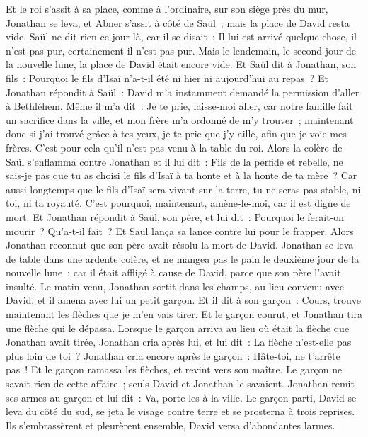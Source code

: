 \begin{multicols}{2}
Et le roi s'assit à sa place, comme à l'ordinaire, sur son siège près du mur, Jonathan se leva, et Abner s'assit à côté de Saül~; mais la place de David resta vide.
Saül ne dit rien ce jour-là, car il se disait~: Il lui est arrivé quelque chose, il n'est pas pur, certainement il n'est pas pur.
Mais le lendemain, le second jour de la nouvelle lune, la place de David était encore vide. Et Saül dit à Jonathan, son fils~: Pourquoi le fils d'Isaï n'a-t-il été ni hier ni aujourd'hui au repas~?
Et Jonathan répondit à Saül~: David m'a instamment demandé la permission d'aller à Bethléhem.
Même il m'a dit~: Je te prie, laisse-moi aller, car notre famille fait un sacrifice dans la ville, et mon frère m'a ordonné de m'y trouver~; maintenant donc si j'ai trouvé grâce à tes yeux, je te prie que j'y aille, afin que je voie mes frères. C'est pour cela qu'il n'est pas venu à la table du roi.
Alors la colère de Saül s'enflamma contre Jonathan et il lui dit~: Fils de la perfide et rebelle, ne sais-je pas que tu as choisi le fils d'Isaï à ta honte et à la honte de ta mère~?
Car aussi longtemps que le fils d'Isaï sera vivant sur la terre, tu ne seras pas stable, ni toi, ni ta royauté. C'est pourquoi, maintenant, amène-le-moi, car il est digne de mort.
Et Jonathan répondit à Saül, son père, et lui dit~: Pourquoi le ferait-on mourir~? Qu'a-t-il fait~?
Et Saül lança sa lance contre lui pour le frapper. Alors Jonathan reconnut que son père avait résolu la mort de David.
Jonathan se leva de table dans une ardente colère, et ne mangea pas le pain le deuxième jour de la nouvelle lune~; car il était affligé à cause de David, parce que son père l'avait insulté.
Le matin venu, Jonathan sortit dans les champs, au lieu convenu avec David, et il amena avec lui un petit garçon.
Et il dit à son garçon~: Cours, trouve maintenant les flèches que je m'en vais tirer. Et le garçon courut, et Jonathan tira une flèche qui le dépassa.
Lorsque le garçon arriva au lieu où était la flèche que Jonathan avait tirée, Jonathan cria après lui, et lui dit~: La flèche n'est-elle pas plus loin de toi~?
Jonathan cria encore après le garçon~: Hâte-toi, ne t'arrête pas~! Et le garçon ramassa les flèches, et revint vers son maître.
Le garçon ne savait rien de cette affaire~; seuls David et Jonathan le savaient.
Jonathan remit ses armes au garçon et lui dit~: Va, porte-les à la ville.
Le garçon parti, David se leva du côté du sud, se jeta le visage contre terre et se prosterna à trois reprises. Ils s'embrassèrent et pleurèrent ensemble, David versa d'abondantes larmes.

\end{multicols}
